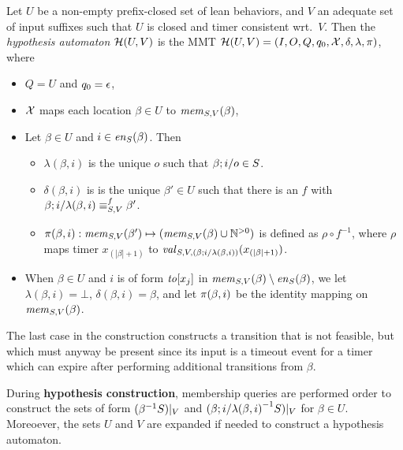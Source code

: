 \begin{definition}
\label{def:hypo}
  Let $U$ be a non-empty prefix-closed set of lean behaviors,
  and $V$ an adequate set of input suffixes such that
  $U$ is closed and timer consistent wrt.\ $V$. Then the
{\em hypothesis automaton} $\hypoof UV$ is the MMT
$\hypoof UV = (I, O, Q, q_0, \vars, \delta, \lambda, \remap)$, where
\begin{itemize}
\item $Q = U$ and $q_0 = \emptyword$,
\item $\vars$ maps each location $\beta\in U$ to $\apprgetmemorable{S}{\beta}{V}$,
\item Let $\beta \in U$ and $i \in \feasibleinputs{\beta}{S}$. Then
  \begin{itemize}
    \item $\lambda(\beta,i)$ is
     the unique $o$ such that $\extend{\beta}{i}{o} \in S$. 
    \item $\delta(\beta,i)$ is is
        the unique $\beta' \in U$ such that there is an $f$ with
  $\extend{\beta}{i}{\lambda(\beta,i)} \equiv_{S,V}^f \beta'$.
  \item $\remap(\beta,i):\apprgetmemorable{S}{\beta'}{V} \mapsto (\apprgetmemorable{S}{\beta}{V} \cup \natplus)$ is defined as $\rho \circ f^{-1}$, where $\rho$ maps timer $x_{(|\beta|+1)}$ to
$\apprgetassignment{S}{(\extend{\beta}{i}{\lambda(\beta,i)})}{V}(x_{(|\beta|+1)})$.
  \end{itemize}
\item When $\beta \in U$ and $i$ is of form $\toevent{x_j}$ in
  $\apprgetmemorable{S}{\beta}{V} \setminus \feasibleinputs{\beta}{S}$, we let
  $\lambda(\beta,i) = \bot$, 
  $\delta(\beta,i) = \beta$, and let
  $\remap(\beta,i)$ be the identity mapping on $\apprgetmemorable{S}{\beta}{V}$.
\end{itemize}
\end{definition}
The last case in the construction constructs a transition that is not feasible,
but which must anyway be present since its input is a timeout event for
 a timer which can expire after performing additional transitions from $\beta$.

 During {\bf hypothesis construction}, membership queries are performed order
 to construct the sets of form $\apprsuffixbehs{S}{\beta}{V}$ and
 $\apprsuffixbehs{S}{\extend{\beta}{i}{\lambda(\beta,i)}}{V}$ for $\beta \in U$.
 Moreoever, the sets $U$ and $V$ are expanded if needed to construct
 a hypothesis automaton.

